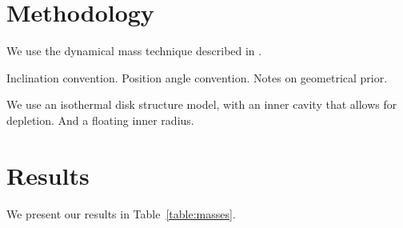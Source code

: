 \documentclass[twocolumn]{aastex6}
\begin{document}
\section{Methodology}

We use the dynamical mass technique described in \citet{czekala15a}.


Inclination convention. Position angle convention. Notes on geometrical prior.

We use an isothermal disk structure model, with an inner cavity that allows for depletion. And a floating inner radius.

\section{Results}

We present our results in Table~\ref{table:masses}.

\end{document}
